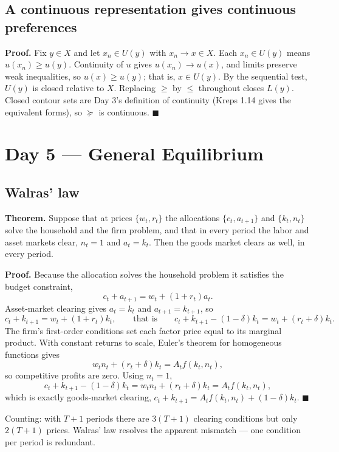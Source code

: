 \documentclass[11pt,a4paper]{article}
\newcommand{\slideref}[1]{\par\vspace{-.3em}{\small\itshape Supports: #1.}\par\vspace{.55em}}
\newcommand{\done}{\hfill$\blacksquare$}
\begin{document}
\subsection{A continuous representation gives continuous preferences}
\slideref{``Continuous Representations and Closed Contours''}
\textbf{Proof.}
Fix $y\in X$ and let $x_n\in U(y)$ with $x_n\to x\in X$. Each $x_n\in U(y)$
means $u(x_n)\geq u(y)$. Continuity of $u$ gives $u(x_n)\to u(x)$, and limits
preserve weak inequalities, so $u(x)\geq u(y)$; that is, $x\in U(y)$. By the
sequential test, $U(y)$ is closed relative to $X$. Replacing $\geq$ by $\leq$
throughout closes $L(y)$. Closed contour sets are Day 3's definition of
continuity (Kreps 1.14 gives the equivalent forms), so $\succeq$ is continuous. \done

\section{Day 5 --- General Equilibrium}

\subsection{Walras' law}
\slideref{``Market Clearing''}
\textbf{Theorem.} Suppose that at prices $\{w_t,r_t\}$ the allocations
$\{c_t,a_{t+1}\}$ and $\{k_t,n_t\}$ solve the household and the firm problem,
and that in every period the labor and asset markets clear, $n_t=1$ and
$a_t=k_t$. Then the goods market clears as well, in every period.

\noindent\textbf{Proof.}
Because the allocation solves the household problem it satisfies the budget
constraint,
\[
c_t+a_{t+1}=w_t+(1+r_t)a_t .
\]
Asset-market clearing gives $a_t=k_t$ and $a_{t+1}=k_{t+1}$, so
\[
c_t+k_{t+1}=w_t+(1+r_t)k_t,
\qquad\text{that is}\qquad
c_t+k_{t+1}-(1-\delta)k_t=w_t+(r_t+\delta)k_t .
\]
The firm's first-order conditions set each factor price equal to its marginal
product. With constant returns to scale, Euler's theorem for homogeneous
functions gives
\[
w_tn_t+(r_t+\delta)k_t=A_tf(k_t,n_t),
\]
so competitive profits are zero. Using $n_t=1$,
\[
c_t+k_{t+1}-(1-\delta)k_t=w_tn_t+(r_t+\delta)k_t=A_tf(k_t,n_t),
\]
which is exactly goods-market clearing,
$c_t+k_{t+1}=A_tf(k_t,n_t)+(1-\delta)k_t$. \done

\noindent
Counting: with $T+1$ periods there are $3(T+1)$ clearing conditions but only
$2(T+1)$ prices. Walras' law resolves the apparent mismatch --- one condition
per period is redundant.
\end{document}
